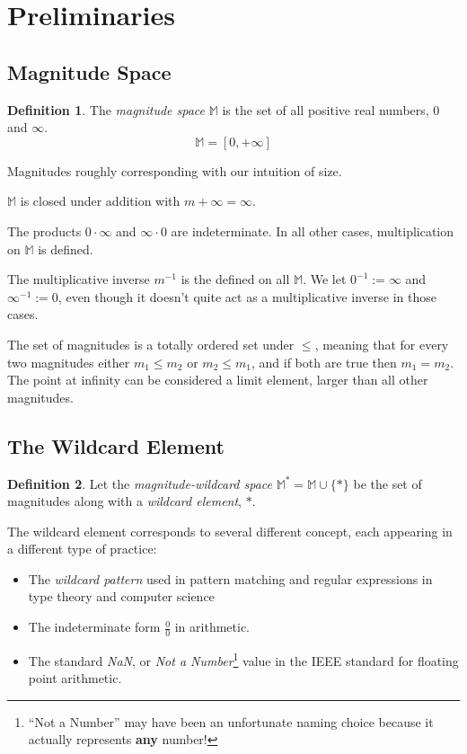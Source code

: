 \documentclass[twoside]{article}
\newcommand{\quotes}[1]{``#1''}
\theoremstyle{plain}%
\theoremstyle{definition}
\newtheorem{definition}{Definition}[section]
\theoremstyle{remark}
\begin{document}
\section{Preliminaries}
\subsection{Magnitude Space}
\begin{definition}
The \textit{magnitude space} \(\mathbb{M}\) is the set of all positive real numbers, \(0\) and \(\infty\).
\[\mathbb{M} = [0, +\infty]\]
\end{definition}

Magnitudes roughly corresponding with our intuition of size.

\(\mathbb{M}\) is closed under addition with \(m + \infty = \infty\).

The products \(0 \cdot \infty\) and \(\infty \cdot 0\) are indeterminate. In all other cases, multiplication on \(\mathbb{M}\) is defined.

The multiplicative inverse \(m^{-1}\) is the defined on all \(\mathbb{M}\). We let \(0^{-1} := \infty\) and \(\infty^{-1} := 0\), even though it doesn't quite act as a multiplicative inverse in those cases.

The set of magnitudes is a totally ordered set under \(\leq\), meaning that for every two magnitudes either \(m_1 \leq m_2\) or \(m_2 \leq m_1\), and if both are true then \(m_1 = m_2\). The point at infinity can be considered a limit element, larger than all other magnitudes.

\subsection{The Wildcard Element}

\begin{definition}
Let the \textit{magnitude-wildcard space} \(\mathbb{M}^*= \mathbb{M} \cup \{\ast\}\) be the set of magnitudes along with a \textit{wildcard element}, \(\ast\).
\end{definition}

The wildcard element corresponds to several different concept, each appearing in a different type of practice:
\begin{itemize}
  \item The \textit{wildcard pattern} used in pattern matching and regular expressions in type theory and computer science
  \item The indeterminate form \(\frac{0}{0}\) in arithmetic.
  \item The standard \textit{NaN}, or \textit{Not a Number}\footnote{\quotes{Not a Number} may have been an unfortunate naming choice because it actually represents \textbf{any} number!} value in the IEEE standard for floating point arithmetic\cite{ieee}.
\end{itemize}
\end{document}
